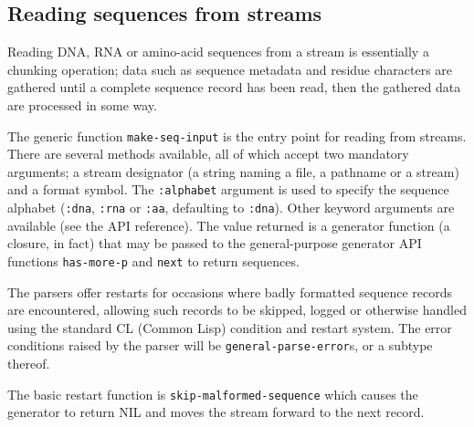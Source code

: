 \documentclass[a4paper, 12pt]{article}
\begin{document}
\subsection{Reading sequences from streams}
\label{sec:read-bioseq-stream}

Reading DNA, RNA or amino-acid sequences from a stream is essentially
a chunking operation; data such as sequence metadata and residue
characters are gathered until a complete sequence record has been
read, then the gathered data are processed in some way.

The generic function \lstinline!make-seq-input! is the entry point for
reading from streams. There are several methods available, all of
which accept two mandatory arguments; a stream designator (a string
naming a file, a pathname or a stream) and a format symbol. The
\lstinline!:alphabet! argument is used to specify the sequence
alphabet (\lstinline!:dna!, \lstinline!:rna! or \lstinline!:aa!,
defaulting to \lstinline!:dna!). Other keyword arguments are available
(see the API reference). The value returned is a generator function (a
closure, in fact) that may be passed to the general-purpose generator
API functions \lstinline!has-more-p! and \lstinline!next! to return
sequences.

The parsers offer restarts for occasions where badly formatted
sequence records are encountered, allowing such records to be skipped,
logged or otherwise handled using the standard CL (Common Lisp)
condition and restart system. The error conditions raised by the
parser will be \lstinline!general-parse-error!s, or a subtype thereof.

The basic restart function is \lstinline!skip-malformed-sequence!
which causes the generator to return NIL and moves the stream forward
to the next record.
\end{document}
